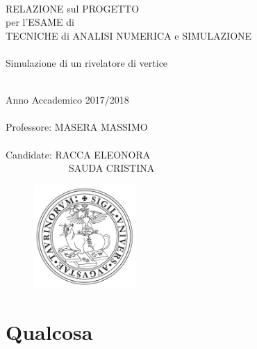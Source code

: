 \documentclass[11pt,a4paper]{article}
\begin{document}
\thispagestyle{empty}

\rmfamily
\begin{center}
\ \\
\vspace{2cm}

\LARGE{\textcolor[rgb]{1,0,0}{RELAZIONE sul PROGETTO\\ per l'ESAME di\\TECNICHE di ANALISI NUMERICA e SIMULAZIONE}\\}
\huge{\textcolor[rgb]{1,0,0}{\ \\Simulazione di un rivelatore di vertice}\\}
\hrulefill \\
\vspace{1.5cm}

\Large{Anno Accademico 2017/2018
\\ \ \\
Professore: MASERA MASSIMO
\\ \ \\ 
Candidate: RACCA ELEONORA\\
\ \ \ \ \ \ \ \ \ \ \ \ \ SAUDA CRISTINA}

\vspace{6cm}
\begin{figure}[h]
\centering
	\includegraphics[width=0.35\textwidth]{logounito.pdf}
\end{figure}

\end{center}

\newpage
\tableofcontents
\newpage

\section{Qualcosa}
\end{document}
